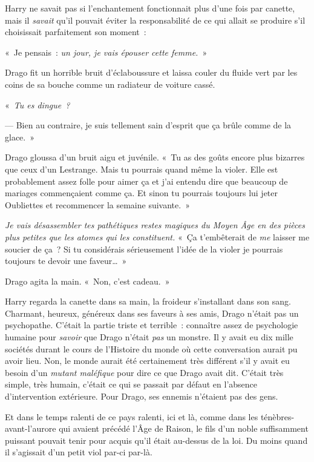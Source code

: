 Harry ne savait pas si l'enchantement fonctionnait plus d'une fois par canette, mais il \emph{savait} qu'il pouvait éviter la responsabilité de ce qui allait se produire s'il choisissait parfaitement son moment~:

«~Je pensais~: \emph{un jour, je vais épouser cette femme.}~»

Drago fit un horrible bruit d'éclaboussure et laissa couler du fluide vert par les coins de sa bouche comme un radiateur de voiture cassé.

«~\emph{Tu es dingue~?}

--- Bien au contraire, je suis tellement sain d'esprit que ça brûle comme de la glace.~»

Drago gloussa d'un bruit aigu et juvénile. «~Tu as des goûts encore plus bizarres que ceux d'un Lestrange. Mais tu pourrais quand même la violer. Elle est probablement assez folle pour aimer ça et j'ai entendu dire que beaucoup de mariages commençaient comme ça. Et sinon tu pourrais toujours lui jeter Oubliettes et recommencer la semaine suivante.~»

\emph{Je vais désassembler tes pathétiques restes magiques du Moyen Âge en des pièces plus petites que les atomes qui les constituent.} «~Ça t'embêterait de \emph{me} laisser me soucier de ça~? Si tu considérais sérieusement l'idée de la violer je pourrais toujours te devoir une faveur…~»

Drago agita la main. «~Non, c'est cadeau.~»

Harry regarda la canette dans sa main, la froideur s'installant dans son sang. Charmant, heureux, généreux dans ses faveurs à ses amis, Drago n'était pas un psychopathe. C'était la partie triste et terrible~: connaître assez de psychologie humaine pour \emph{savoir} que Drago n'était \emph{pas} un monstre. Il y avait eu dix mille sociétés durant le cours de l'Histoire du monde où cette conversation aurait pu avoir lieu. Non, le monde aurait été certainement très différent s'il y avait eu besoin d'un \emph{mutant maléfique} pour dire ce que Drago avait dit. C'était très simple, très humain, c'était ce qui se passait par défaut en l'absence d'intervention extérieure. Pour Drago, ses ennemis n'étaient pas des gens.

Et dans le temps ralenti de ce pays ralenti, ici et là, comme dans les ténèbres-avant-l'aurore qui avaient précédé l'Âge de Raison, le fils d'un noble suffisamment puissant pouvait tenir pour acquis qu'il était au-dessus de la loi. Du moins quand il s'agissait d'un petit viol par-ci par-là.

